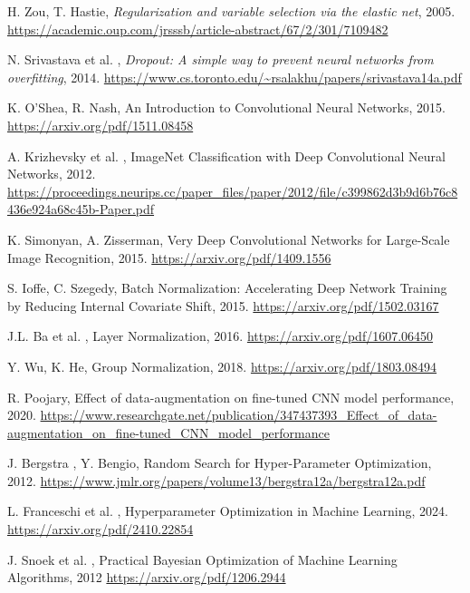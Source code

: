 \documentclass[a4paper,12pt]{report}
\begin{document}
\begin{thebibliography}{99}
		H. Zou, T. Hastie, \emph{Regularization and variable selection via the elastic net}, 2005. \url{https://academic.oup.com/jrsssb/article-abstract/67/2/301/7109482}
		
		N. Srivastava et al. , \emph{Dropout: A simple way to prevent neural networks from overfitting}, 2014. \url{https://www.cs.toronto.edu/~rsalakhu/papers/srivastava14a.pdf}
		
		K. O'Shea, R. Nash, An Introduction to Convolutional Neural Networks, 2015. \url{https://arxiv.org/pdf/1511.08458}
		
		A. Krizhevsky et al. , ImageNet Classification with Deep Convolutional Neural Networks, 2012. \url{https://proceedings.neurips.cc/paper_files/paper/2012/file/c399862d3b9d6b76c8436e924a68c45b-Paper.pdf}
		
		K. Simonyan, A. Zisserman, Very Deep Convolutional Networks for Large-Scale Image Recognition, 2015. \url{https://arxiv.org/pdf/1409.1556}
		
		S. Ioffe, C. Szegedy, Batch Normalization: Accelerating Deep Network Training by Reducing Internal Covariate Shift, 2015. \url{https://arxiv.org/pdf/1502.03167}
		
		J.L. Ba et al. , Layer Normalization, 2016. \url{https://arxiv.org/pdf/1607.06450}
		
		Y. Wu, K. He, Group Normalization, 2018. \url{https://arxiv.org/pdf/1803.08494}
		
		R. Poojary, Effect of data-augmentation on fine-tuned CNN model performance, 2020. \url{https://www.researchgate.net/publication/347437393_Effect_of_data-augmentation_on_fine-tuned_CNN_model_performance}
		
		J. Bergstra , Y. Bengio, Random Search for Hyper-Parameter Optimization, 2012. \url{https://www.jmlr.org/papers/volume13/bergstra12a/bergstra12a.pdf}
		
		L. Franceschi et al. , Hyperparameter Optimization in Machine Learning, 2024. \url{https://arxiv.org/pdf/2410.22854}
		
		J. Snoek et al. , Practical Bayesian Optimization of Machine Learning Algorithms, 2012 \url{https://arxiv.org/pdf/1206.2944}
		

\end{thebibliography}
\end{document}
